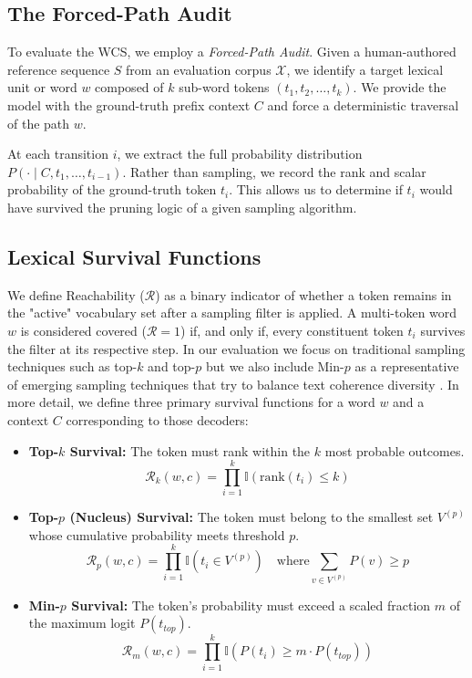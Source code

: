 \documentclass{article}
\begin{document}
\subsection{The Forced-Path Audit}

To evaluate the WCS, we employ a \textit{Forced-Path Audit}. Given a human-authored reference sequence $S$ from an evaluation corpus $\mathcal{X}$, we identify a target lexical unit or word $w$ composed of $k$ sub-word tokens $(t_1, t_2, \dots, t_k)$. We provide the model with the ground-truth prefix context $C$ and force a deterministic traversal of the path $w$.

At each transition $i$, we extract the full probability distribution $P(\cdot \mid C, t_1, \dots, t_{i-1})$. Rather than sampling, we record the rank and scalar probability of the ground-truth token $t_i$. This allows us to determine if $t_i$ would have survived the pruning logic of a given sampling algorithm.

\subsection{Lexical Survival Functions}

We define Reachability ($\mathcal{R}$) as a binary indicator of whether a token remains in the "active" vocabulary set after a sampling filter is applied. A multi-token word $w$ is considered covered ($\mathcal{R}=1$) if, and only if, every constituent token $t_i$ survives the filter at its respective step. In our evaluation we focus on traditional sampling techniques such as top-$k$ and top-$p$ but we also include Min-$p$ as a representative of emerging sampling techniques that try to balance text coherence diversity \cite{minp, ding2026mink, tang2024topnsigma}. In more detail, we define three primary survival functions for a word $w$ and a context $C$ corresponding to those decoders:

\begin{itemize}
    \item \textbf{Top-$k$ Survival:} The token must rank within the $k$ most probable outcomes.
    \begin{equation}
        \mathcal{R}_k(w,c) = \prod_{i=1}^{k} \mathbb{I}(\text{rank}(t_i) \leq k)
    \end{equation}

    \item \textbf{Top-$p$ (Nucleus) Survival:} The token must belong to the smallest set $V^{(p)}$ whose cumulative probability meets threshold $p$.
    \begin{equation}
        \mathcal{R}_p(w,c) = \prod_{i=1}^{k} \mathbb{I}(t_i \in V^{(p)}) \quad \text{where} \sum_{v \in V^{(p)}} P(v) \geq p
    \end{equation}

    \item \textbf{Min-$p$ Survival:} The token's probability must exceed a scaled fraction $m$ of the maximum logit $P(t_{top})$.
    \begin{equation}
        \mathcal{R}_m(w,c) = \prod_{i=1}^{k} \mathbb{I}\left(P(t_i) \geq m \cdot P(t_{top})\right)
    \end{equation}
\end{itemize}
\end{document}
